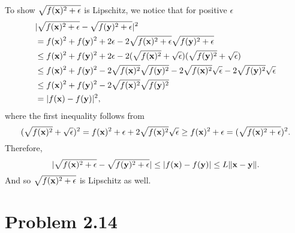 \documentclass{scrartcl}
\begin{document}
To show $\sqrt{f(\mathbf{x})^2+\epsilon}$ is Lipschitz, we notice that for positive $\epsilon$
\begin{equation}
	\begin{split}
	& |\sqrt{f(\mathbf{x})^2+\epsilon}-\sqrt{f(\mathbf{y})^2+\epsilon}|^2 \\
	& = f(\mathbf{x})^2+f(\mathbf{y})^2+2\epsilon-2\sqrt{f(\mathbf{x})^2+\epsilon}\sqrt{f(\mathbf{y})^2+\epsilon} \\
	& \le f(\mathbf{x})^2+f(\mathbf{y})^2+2\epsilon-2(\sqrt{f(\mathbf{x})^2}+\sqrt{\epsilon})
	                                        (\sqrt{f(\mathbf{y})^2}+\sqrt{\epsilon}) \\
	& \le f(\mathbf{x})^2+f(\mathbf{y})^2-2\sqrt{f(\mathbf{x})^2}\sqrt{f(\mathbf{y})^2}
			-2\sqrt{f(\mathbf{x})^2}\sqrt{\epsilon}-2\sqrt{f(\mathbf{y})^2}\sqrt{\epsilon} \\
	& \le  f(\mathbf{x})^2+f(\mathbf{y})^2 - 2\sqrt{f(\mathbf{x})^2}\sqrt{f(\mathbf{y})^2} \\
	& = |f(\mathbf{x})-f(\mathbf{y})|^2 ,
	\end{split}
\end{equation}
where the first inequality follows from
\begin{equation}
	(\sqrt{f(\mathbf{x})^2}+\sqrt{\epsilon})^2
	= f(\mathbf{x})^2 + \epsilon + 2\sqrt{f(\mathbf{x})^2}\sqrt{\epsilon}
	\ge f(\mathbf{x})^2+\epsilon
	= (\sqrt{f(\mathbf{x})^2+\epsilon})^2 . 
\end{equation}
Therefore,
\begin{equation}
 |\sqrt{f(\mathbf{x})^2+\epsilon}-\sqrt{f(\mathbf{y})^2+\epsilon}|
 \le |f(\mathbf{x})-f(\mathbf{y})|
 \le L \|\mathbf{x}-\mathbf{y}\| .
\end{equation}
And so $\sqrt{f(\mathbf{x})^2+\epsilon}$ is Lipschitz as well.





\section*{Problem 2.14}
\end{document}
